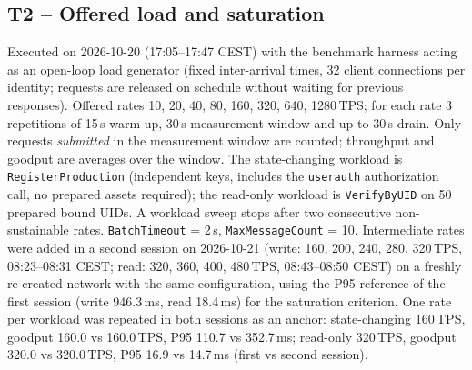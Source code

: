 \subsection{T2 -- Offered load and saturation}
Executed on 2026-10-20 (17:05--17:47 CEST) with the benchmark harness acting as an
open-loop load generator (fixed inter-arrival times, 32 client connections per identity; requests are
released on schedule without waiting for previous responses). Offered rates 10, 20, 40, 80, 160, 320, 640, 1280\,TPS; for each
rate 3 repetitions of 15\,s warm-up, 30\,s measurement window and up to
30\,s drain. Only requests \emph{submitted} in the measurement window are counted; throughput and
goodput are averages over the window. The state-changing workload is \texttt{RegisterProduction} (independent keys,
includes the \texttt{userauth} authorization call, no prepared assets required); the read-only workload is
\texttt{VerifyByUID} on 50 prepared bound UIDs. A workload sweep stops after two consecutive
non-sustainable rates. \texttt{BatchTimeout} = 2\,s, \texttt{MaxMessageCount} = 10. Intermediate rates were added in a second session on 2026-10-21 (write: 160, 200, 240, 280, 320\,TPS, 08:23--08:31 CEST; read: 320, 360, 400, 480\,TPS, 08:43--08:50 CEST) on a freshly re-created network with the same configuration, using the P95 reference of the first session (write 946.3\,ms, read 18.4\,ms) for the saturation criterion. One rate per workload was repeated in both sessions as an anchor: state-changing 160\,TPS, goodput 160.0 vs 160.0\,TPS, P95 110.7 vs 352.7\,ms; read-only 320\,TPS, goodput 320.0 vs 320.0\,TPS, P95 16.9 vs 14.7\,ms (first vs second session).

